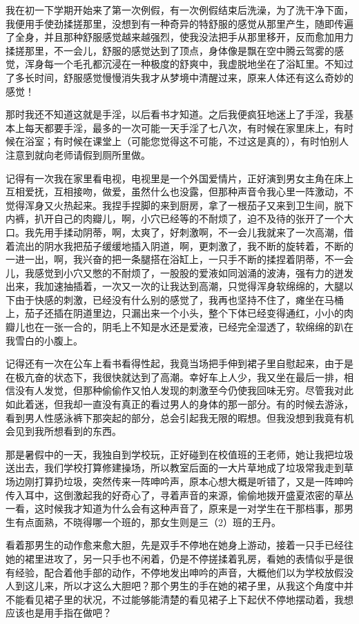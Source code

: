 \documentclass[12pt,UTF8]{ctexbook}
\begin{document}
我在初一下学期开始来了第一次例假，有一次例假结束后洗澡，为了洗干净下面，我便用手使劲揉搓那里，没想到有一种奇异的特舒服的感觉从那里产生，随即传遍了全身，并且那种舒服感觉越来越强烈，使我没法把手从那里移开，反而愈加用力揉搓那里，不一会儿，舒服的感觉达到了顶点，身体像是飘在空中腾云驾雾的感觉，浑身每一个毛孔都沉浸在一种极度的舒爽中，我虚脱地坐在了浴缸里。不知过了多长时间，舒服感觉慢慢消失我才从梦境中清醒过来，原来人体还有这么奇妙的感觉！

那时我还不知道这就是手淫，以后看书才知道。之后我便疯狂地迷上了手淫，我基本上每天都要手淫，最多的一次可能一天手淫了七八次，有时候在家里床上，有时候在浴室；有时候在课堂上（可能您觉得这不可能，不过这是真的），有时怕别人注意到就向老师请假到厕所里做。

记得有一次我在家里看电视，电视里是一个外国爱情片，正好演到男女主角在床上互相爱抚，互相接吻，做爱，虽然什么也没露，但那种声音令我心里一阵激动，不觉得浑身又火热起来。我捏手捏脚的来到厨房，拿了一根茄子又来到卫生间，脱下内裤，扒开自己的肉瓣儿，啊，小穴已经等的不耐烦了，迫不及待的张开了一个大口。我先用手揉动阴蒂，啊，太爽了，好刺激啊，不一会儿我就来了一次高潮，借着流出的阴水我把茄子缓缓地插入阴道，啊，更刺激了，我不断的旋转着，不断的一进一出，啊，我兴奋的把一条腿搭在浴缸上，一只手不断的揉捏着阴蒂，不一会儿，我感觉到小穴又憋的不耐烦了，一股股的爱液如同汹涌的波涛，强有力的迸发出来，我加速抽插着，一次又一次的让我达到高潮，只觉得浑身软绵绵的，大腿以下由于快感的刺激，已经没有什么别的感觉了，我再也坚持不住了，瘫坐在马桶上，茄子还插在阴道里边，只漏出来一个小头，整个下体已经变得通红，小小的肉瓣儿也在一张一合的，阴毛上不知是水还是爱液，已经完全湿透了，软绵绵的趴在我雪白的小腹上。

记得还有一次在公车上看书看得性起，我竟当场把手伸到裙子里自慰起来，由于是在极亢奋的状态下，我很快就达到了高潮。幸好车上人少，我又坐在最后一排，相信没有人发觉，但那种偷偷作又怕人发现的刺激至今仍使我回味无穷。尽管我对此如此着迷，但我却一直没有真正的看过男人的身体的那一部分。有的时候去游泳，看到男人性感泳裤下那突起的部分，总会引起我无限的暇想。但我没想到我竟有机会见到我所想看到的东西。

那是暑假中的一天，我独自到学校玩，正好碰到在校值班的王老师，她让我把垃圾送出去，我们学校打算修建操场，所以教室后面的一大片草地成了垃圾常我走到草场边刚打算扔垃圾，突然传来一阵呻吟声，原本心想大概是听错了，又是一阵呻吟传入耳中，这倒激起我的好奇心了，寻着声音的来源，偷偷地拨开盛夏浓密的草丛一看，这时候我才知道为什么会有这种声音了，原来是一对学生在干那档事，那男生有点面熟，不晓得哪一个班的，那女生则是三（2）班的王丹。

看着那男生的动作愈来愈大胆，先是双手不停地在她身上游动，接着一只手已经往她的裙里进攻了，另一只手也不闲着，仍是不停搓揉着乳房，看她的表情似乎是很有经验，配合着他手部的动作，不停地发出呻吟的声音，大概他们以为学校放假没人到这儿来，所以才这么大胆吧？那个男生的手在她的裙子里，从我这个角度中并不能看见裙子里的状况，不过能够能清楚的看见裙子上下起伏不停地摆动着，我想应该也是用手指在做吧？
\end{document}
